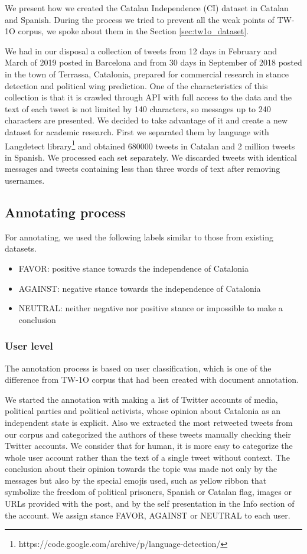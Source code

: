 \documentclass[10pt, a4paper]{article}
\begin{document}
We present how we created the Catalan Independence (CI) dataset in Catalan and Spanish. During the process we tried to prevent all the weak points of TW-1O corpus, we spoke about them in the Section \ref{sec:tw1o_dataset}. 

We had in our disposal a collection of tweets from 12 days in February and March of 2019 posted in Barcelona and from 30 days in September of 2018 posted in the town of Terrassa, Catalonia, prepared for commercial research in stance detection and political wing prediction. One of the characteristics of this collection is that it is crawled through API with full access to the data and the text of each tweet is not limited by 140 characters, so messages up to 240 characters are presented. We decided to take advantage of it and create a new dataset for academic research. First we separated them by language with Langdetect library\footnote{https://code.google.com/archive/p/language-detection/} and obtained 680000 tweets in Catalan and 2 million tweets in Spanish. We processed each set separately. We discarded tweets with identical messages and tweets containing less than three words of text after removing usernames.   

\subsection{Annotating process}

For annotating, we used the following labels similar to  those from existing datasets. 
\begin{itemize}
\item FAVOR: positive stance towards the independence of Catalonia 
\item AGAINST: negative stance towards the independence of Catalonia 
\item NEUTRAL: neither negative nor positive stance or impossible to make a conclusion 
\end{itemize}

\subsubsection{User level}

The annotation process is based on user classification, which  is one of the difference from TW-1O corpus that had been created with document annotation. 

We started the annotation with making a list of Twitter accounts of media, political parties and political activists, whose opinion about Catalonia as an independent state is explicit. Also we extracted the most retweeted tweets from our corpus and categorized the authors of these tweets manually checking their Twitter accounts. We consider that for human, it is more easy to categorize the whole user account rather than the text of a single tweet without context. The conclusion about their opinion towards the topic was made not only by the messages but also  by  the special emojis used, such as yellow ribbon that symbolize the freedom of political prisoners, Spanish or Catalan flag, images or URLs provided  with the post, and by the self presentation in the Info section of the account. We assign stance FAVOR, AGAINST or NEUTRAL to each user.  
\end{document}

